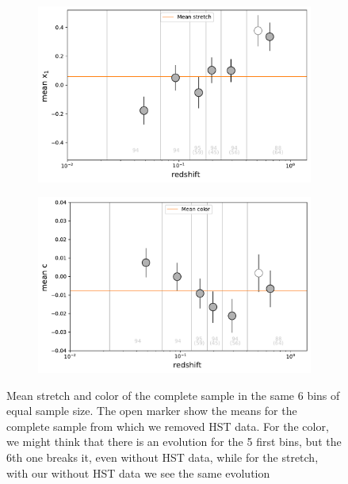 \documentclass[11pt,a4paper]{paper}
\begin{document}
\begin{figure}[htbp!]
    \centering
    \begin{subfigure}
        \centering
        \includegraphics[width=.45\linewidth]{Answer_figures/mean_stretchs-nHST.pdf}
    \end{subfigure}
    \begin{subfigure}
        \centering
        \includegraphics[width=.45\linewidth]{Answer_figures/mean_colors-nHST.pdf}
    \end{subfigure}
    \centering
    \captionsetup{justification=centering}

    \caption{Mean stretch and color of the complete sample in the same 6 bins of
        equal sample size. The open marker show the means for the complete
        sample from which we removed HST data. For the color, we might think
        that there is an evolution for the 5 first bins, but the 6th one breaks
    it, even without HST data, while for the stretch, with our without HST data
we see the same evolution}

    \label{fig:means}
\end{figure}
\end{document}
